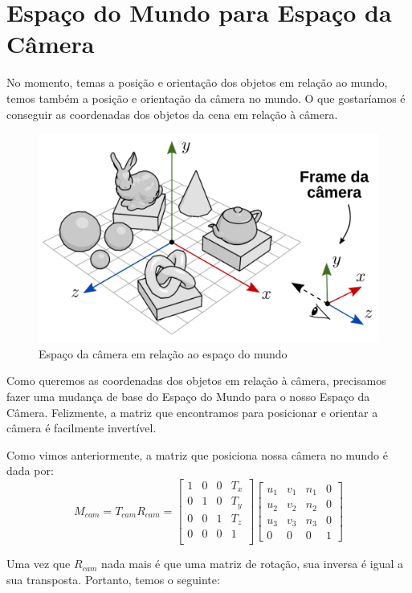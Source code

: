 \documentclass[12pt]{article}
\begin{document}
\section{Espaço do Mundo para Espaço da Câmera}

No momento, temas a posição e orientação dos objetos em relação ao mundo, temos também a posição e orientação da câmera no mundo. O que gostaríamos é conseguir as coordenadas dos objetos da cena em relação à câmera.

\begin{figure}[H]
    \centering
    \includegraphics[width=0.6\linewidth]{imgs/07_glspace7.png}
    \caption{Espaço da câmera em relação ao espaço do mundo}
\end{figure}

Como queremos as coordenadas dos objetos em relação à câmera, precisamos fazer uma mudança de base do Espaço do Mundo para o nosso Espaço da Câmera. Felizmente, a matriz que encontramos para posicionar e orientar a câmera é facilmente invertível.

Como vimos anteriormente, a matriz que posiciona nossa câmera no mundo é dada por:
\[
M_{cam} = T_{cam} R_{cam} = 
\begin{bmatrix}
    1 & 0 & 0 & T_{x} \\
    0 & 1 & 0 & T_{y} \\
    0 & 0 & 1 & T_{z} \\
    0 & 0 & 0 & 1 \\
\end{bmatrix}
\begin{bmatrix}
    u_1 & v_1 & n_1 & 0   \\
    u_2 & v_2 & n_2 & 0   \\    
    u_3 & v_3 & n_3 & 0   \\
    0 & 0 & 0 & 1
\end{bmatrix}
\]

Uma vez que $R_{cam}$ nada mais é que uma matriz de rotação, sua inversa é igual a sua transposta. Portanto, temos o seguinte:
\end{document}
